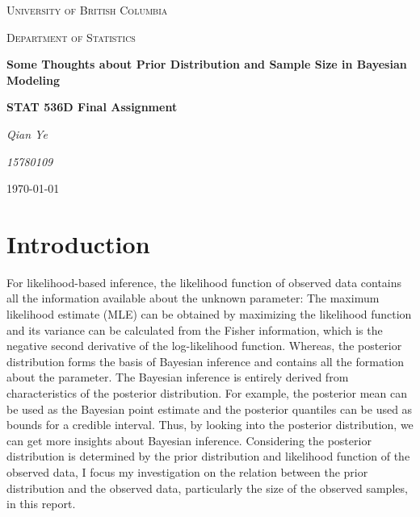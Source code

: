 \documentclass{article}
\numberwithin{equation}{section}
\theoremstyle{plain}
\begin{document}
\begin{onehalfspacing}
\begin{titlepage}			%
	\centering
	{\scshape\LARGE University of British Columbia\par}
	{\scshape \LARGE Department of Statistics\par}
	\vspace{1cm}
	{\LARGE \bfseries Some Thoughts about Prior Distribution and Sample Size in Bayesian Modeling\par}
	\vspace{1cm}
	{\Large \bfseries STAT 536D Final Assignment\par}
	\vspace{3cm}
	{\Large\itshape Qian Ye \par}		%
	\vspace{0.5cm}
	{\large \itshape 15780109\par}		%
	\vspace{1cm}
	{\large \today\par}
\end{titlepage}
\end{onehalfspacing}

\section{Introduction}
For likelihood-based inference, the likelihood function of observed data contains all the information available about the unknown parameter: The maximum likelihood estimate (MLE) can be obtained by maximizing the likelihood function and its variance can be calculated from the Fisher information, which is the negative second derivative of the log-likelihood function. Whereas, the posterior distribution forms the basis of Bayesian inference and contains all the formation about the parameter. The Bayesian inference is entirely derived from characteristics of the posterior distribution. For example, the posterior mean can be used as the Bayesian point estimate and the posterior quantiles can be used as bounds for a credible interval. Thus, by looking into the posterior distribution, we can get more insights about Bayesian inference. Considering the posterior distribution is determined by the prior distribution and likelihood function of the observed data, I focus my investigation on the relation between the prior distribution and the observed data, particularly the size of the observed samples, in this report. 
\end{document}
